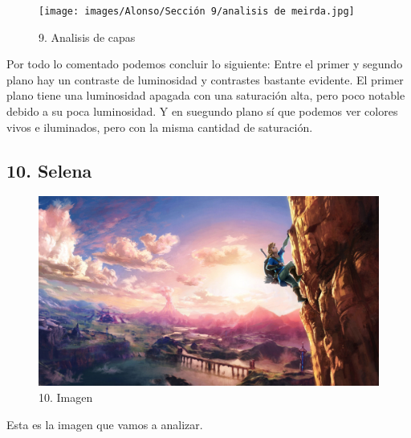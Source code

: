 \documentclass[12pt]{article}
\begin{document}
    \begin{figure}[H]
      \centering
      \texttt{[image: images/Alonso/Sección 9/analisis de meirda.jpg]}
      \caption{\small 9. Analisis de capas}
    \end{figure}

    Por todo lo comentado podemos concluir lo siguiente: Entre el primer y segundo plano hay un contraste de luminosidad y contrastes bastante evidente. El primer plano tiene una luminosidad apagada con una saturación alta, pero poco notable debido a su poca luminosidad. Y en suegundo plano sí que podemos ver colores vivos e iluminados, pero con la misma cantidad de saturación.


        \newpage


    \subsection{10. Selena}
    \begin{figure}[H]
          \centering
          \includegraphics[scale=0.35]{images/Selena/10_concept_art.jpg}
          \caption{\small 10. Imagen}
        \end{figure}

        Esta es la imagen que vamos a analizar.
\end{document}

